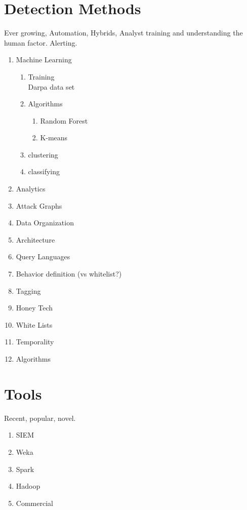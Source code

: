 \documentclass[conference]{IEEEtran}
\begin{document}
\section{Detection Methods}
Ever growing, Automation, Hybrids, Analyst training and understanding the human factor. Alerting.
\begin{enumerate}
    \item Machine Learning\cite{buczak2016survey}\cite{dua2016data} 
    \begin{enumerate}
        \item Training\\
        Darpa data set
        \item Algorithms
        \begin{enumerate}
            \item Random Forest \cite{singh2014big}
            \item K-means\cite{asif2011filtering}\cite{hajamydeen2016unsupervised}
        \end{enumerate}
        \item clustering \cite{asif2011filtering}   
        \item classifying
    \end{enumerate}
    \item Analytics\cite{cardenas2013big}
    \item Attack Graphs\cite{abraham2015predictive}
    \item Data Organization
    \item Architecture
    \item Query Languages\cite{mukherjee1994network}
    \item Behavior definition (vs whitelist?)
    \item Tagging
    \item Honey Tech \cite{jasek2013apt}\cite{saud2015towards}
    \item White Lists\cite{yen2013beehive}
    \item Temporality\cite{abraham2015predictive}\cite{abraham2014cyber}
    \item Algorithms\cite{kim2013detection}
\end{enumerate}
\section{Tools}
Recent, popular, novel.
\begin{enumerate}
    \item SIEM \cite{kotenko2012attack}
    \item Weka \cite{asif2011filtering}\cite{thevar2017effect}
    \item Spark \cite{gupta2016framework}\cite{dobson2018performance}
    \item Hadoop \cite{gupta2014big}\cite{tankard2012big}
    \item Commercial 
\end{enumerate}
\end{document}
